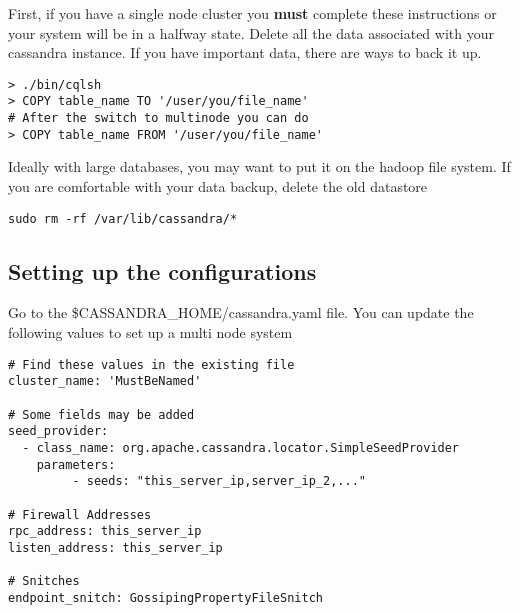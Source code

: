 \documentclass[9pt,twocolumn,twoside]{idsi}
\begin{document}
First, if you have a single node cluster you \textbf{must} complete these instructions or your system will be in a halfway state. Delete all the data associated with your cassandra instance. If you have important data, there are ways to back it up.


\begin{lstlisting}
> ./bin/cqlsh
> COPY table_name TO '/user/you/file_name'
# After the switch to multinode you can do
> COPY table_name FROM '/user/you/file_name'
\end{lstlisting}

Ideally with large databases, you may want to put it on the hadoop file system. If you are comfortable with your data backup, delete the old datastore

\begin{lstlisting}[breaklines]
sudo rm -rf /var/lib/cassandra/*
\end{lstlisting}

\subsection{Setting up the configurations}

Go to the \$CASSANDRA\_HOME/cassandra.yaml file. You can update the following values to set up a multi node system

\begin{lstlisting}[breaklines]
# Find these values in the existing file
cluster_name: 'MustBeNamed'

# Some fields may be added
seed_provider:
  - class_name: org.apache.cassandra.locator.SimpleSeedProvider
    parameters:
         - seeds: "this_server_ip,server_ip_2,..."

# Firewall Addresses
rpc_address: this_server_ip
listen_address: this_server_ip

# Snitches
endpoint_snitch: GossipingPropertyFileSnitch

\end{lstlisting}
\end{document}
